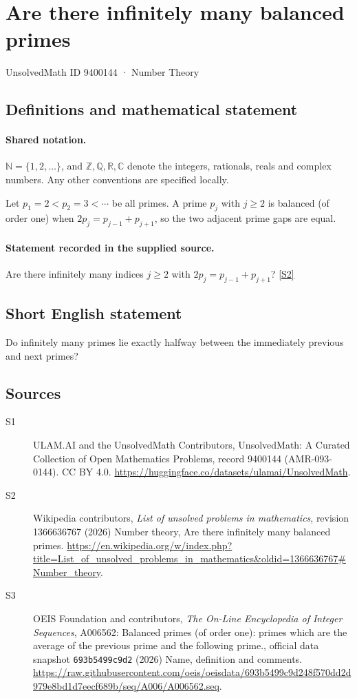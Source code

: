 \documentclass[11pt]{article}
\newcommand{\sref}[2]{\hyperlink{source:#1:#2}{[S#2]}}
\begin{document}
\setcounter{section}{9400143}
\section{Are there infinitely many balanced primes}\label{9400144}
{\small\sffamily UnsolvedMath ID 9400144 · Number Theory}
\subsection{Definitions and mathematical statement}

\paragraph{Shared notation.}$\mathbb N=\{1,2,\ldots\}$, and $\mathbb Z,\mathbb Q,\mathbb R,\mathbb C$ denote the integers, rationals, reals and complex numbers. Any other conventions are specified locally.


Let $p_1=2<p_2=3<\cdots$ be all primes. A prime $p_j$ with $j\ge2$ is balanced (of order one) when $2p_j=p_{j-1}+p_{j+1}$, so the two adjacent prime gaps are equal.
\paragraph{Statement recorded in the supplied source.}
Are there infinitely many indices $j\ge2$ with $2p_j=p_{j-1}+p_{j+1}$? \sref{9400144}{2}
\subsection{Short English statement}
Do infinitely many primes lie exactly halfway between the immediately previous and next primes?
\subsection{Sources}
\begin{description}
\item[\hypertarget{source:9400144:1}{S1}] ULAM.AI and the UnsolvedMath Contributors, UnsolvedMath: A Curated Collection of Open Mathematics Problems, record 9400144 (AMR-093-0144). CC BY 4.0. \url{https://huggingface.co/datasets/ulamai/UnsolvedMath}.
\item[\hypertarget{source:9400144:2}{S2}] Wikipedia contributors, \emph{List of unsolved problems in mathematics}, revision 1366636767 (2026) Number theory, Are there infinitely many balanced primes. \url{https://en.wikipedia.org/w/index.php?title=List_of_unsolved_problems_in_mathematics&oldid=1366636767#Number_theory}.
\item[\hypertarget{source:9400144:3}{S3}] OEIS Foundation and contributors, \emph{The On-Line Encyclopedia of Integer Sequences}, A006562: Balanced primes (of order one): primes which are the average of the previous prime and the following prime., official data snapshot \texttt{693b5499c9d2} (2026) Name, definition and comments. \url{https://raw.githubusercontent.com/oeis/oeisdata/693b5499c9d248f570dd2d979e8bd1d7eecf689b/seq/A006/A006562.seq}.
\end{description}
\label{end:9400144}
\end{document}
